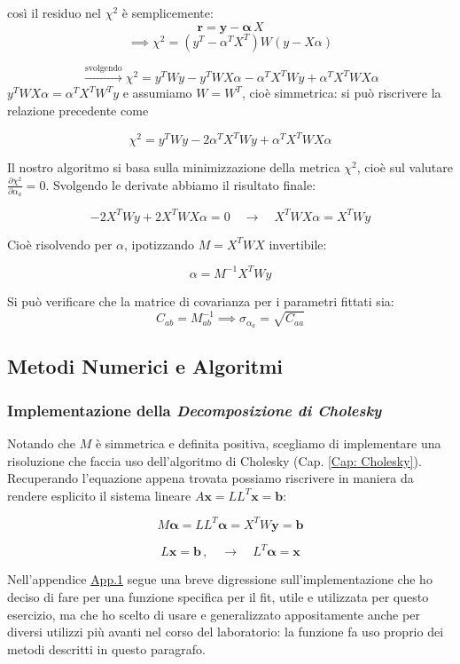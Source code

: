 \noindent così il residuo nel $\chi^2$ è semplicemente:
\[
    \boldsymbol r =\boldsymbol  y - \boldsymbol  \alpha \, X
\]
\[
\implies \chi^2 = (y^T - \alpha^T X^T) W (y - X\alpha)
\]

$$\xrightarrow{\text{svolgendo}}\chi^2 = y^T Wy - y^T W X\alpha - \alpha^T X^T Wy + \alpha^T X^T W X\alpha$$
$y^T W X \alpha = \alpha^T X^T W^T y$ e assumiamo $W=W^T$, cioè simmetrica: si può riscrivere la relazione precedente come

$$\chi^2 = y^T Wy - 2\alpha^T X^T Wy + \alpha^T X^T W X\alpha$$

\bigskip
\noindent Il nostro algoritmo si basa sulla minimizzazione della metrica $\chi^2$, cioè sul valutare $\frac{\partial \chi^2}{\partial \alpha_a} = 0$. Svolgendo le derivate abbiamo il risultato finale:

$$-2X^T Wy + 2X^T WX\alpha = 0 \quad \longrightarrow{} \quad X^T WX \alpha = X^T Wy$$

Cioè risolvendo per $\alpha$, ipotizzando $M = X^T W X$ invertibile:

$$\alpha = M^{-1} X^T Wy$$

Si può verificare che la matrice di covarianza per i parametri fittati sia:
\[
    C_{ab} = M_{ab}^{-1} \implies \sigma_{\alpha_a} = \sqrt{C_{aa}} 
\]

\subsection{Metodi Numerici e Algoritmi}
\subsubsection{Implementazione della \textit{Decomposizione di Cholesky}}
Notando che $M$ è simmetrica e definita positiva, scegliamo di implementare una risoluzione che faccia uso dell'algoritmo di Cholesky (Cap. \ref{Cap: Cholesky}). Recuperando l'equazione appena trovata possiamo riscrivere in maniera da rendere esplicito il sistema lineare $A \boldsymbol{x} = LL^T\boldsymbol{x}= \boldsymbol{b}$:

\[
    M \boldsymbol \alpha = L L^T \boldsymbol \alpha = X^T W \boldsymbol y = \boldsymbol b
\]

\[
    L \boldsymbol x = \boldsymbol b \,, \quad \to \quad L^T \boldsymbol \alpha = \boldsymbol x
\]

\bigskip
\noindent Nell'appendice \hyperref[App: funzione fit]{App.1} segue una breve digressione sull'implementazione che ho deciso di fare per una funzione specifica per il fit, utile e utilizzata per questo esercizio, ma che ho scelto di usare e generalizzato appositamente anche per diversi utilizzi più avanti nel corso del laboratorio: la funzione fa uso proprio dei metodi descritti in questo paragrafo. 

